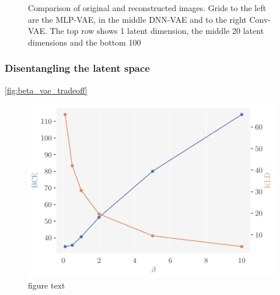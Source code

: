 \begin{figure}[!htb]
\qquad
{}
\caption{Comparison of original and reconstructed images. Grids to the left are the MLP-VAE, in the middle DNN-VAE and to the right Conv-VAE. The top row shows 1 latent dimension, the middle 20 latent dimensions and the bottom 100}
\label{fig:samples_latent_dim_vanilla_vae_bmnist}
\end{figure}





\FloatBarrier
\subsubsection{Disentangling the latent space}

\autoref{fig:beta_vae_tradeoff}
\begin{figure}[!htb]
\begin{center}\includegraphics[scale=0.75]{latex/figures/bce_kld_vs_beta.pdf}
\end{center}
\caption{figure text}
\label{fig:beta_vae_tradeoff}
\end{figure}

